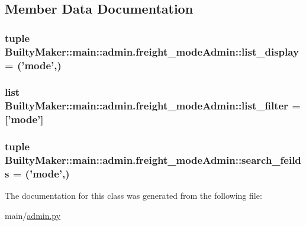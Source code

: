 \subsection{\-Member \-Data \-Documentation}
\hypertarget{classBuiltyMaker_1_1main_1_1admin_1_1freight__modeAdmin_a35ba2b7e7d850303293c80275ce13e2b}{
\subsubsection[{list\-\_\-display}]{\setlength{\rightskip}{0pt plus 5cm}tuple {\bf \-Builty\-Maker\-::main\-::admin.\-freight\-\_\-mode\-Admin\-::list\-\_\-display} = ('mode',)}}\label{classBuiltyMaker_1_1main_1_1admin_1_1freight__modeAdmin_a35ba2b7e7d850303293c80275ce13e2b}
\hypertarget{classBuiltyMaker_1_1main_1_1admin_1_1freight__modeAdmin_a85751e46bc2d5812da3e0fac580ecb80}{
\subsubsection[{list\-\_\-filter}]{\setlength{\rightskip}{0pt plus 5cm}list {\bf \-Builty\-Maker\-::main\-::admin.\-freight\-\_\-mode\-Admin\-::list\-\_\-filter} = \mbox{[}'mode'\mbox{]}}}\label{classBuiltyMaker_1_1main_1_1admin_1_1freight__modeAdmin_a85751e46bc2d5812da3e0fac580ecb80}
\hypertarget{classBuiltyMaker_1_1main_1_1admin_1_1freight__modeAdmin_a2702ca876d6dc56db09ca156c9b80f4e}{
\subsubsection[{search\-\_\-feilds}]{\setlength{\rightskip}{0pt plus 5cm}tuple {\bf \-Builty\-Maker\-::main\-::admin.\-freight\-\_\-mode\-Admin\-::search\-\_\-feilds} = ('mode',)}}\label{classBuiltyMaker_1_1main_1_1admin_1_1freight__modeAdmin_a2702ca876d6dc56db09ca156c9b80f4e}


\-The documentation for this class was generated from the following file\-:\begin{DoxyCompactItemize}
\item 
main/\hyperlink{admin_8py}{admin.\-py}\end{DoxyCompactItemize}
